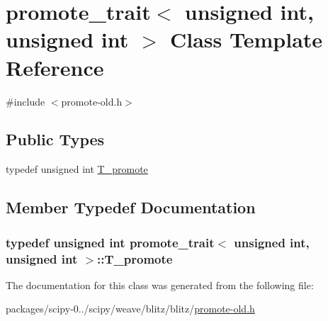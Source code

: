 \hypertarget{classpromote__trait_3_01unsigned_01int_00_01unsigned_01int_01_4}{}\section{promote\+\_\+trait$<$ unsigned int, unsigned int $>$ Class Template Reference}
\label{classpromote__trait_3_01unsigned_01int_00_01unsigned_01int_01_4}


{\ttfamily \#include $<$promote-\/old.\+h$>$}

\subsection*{Public Types}
\begin{DoxyCompactItemize}
\item 
typedef unsigned int \hyperlink{classpromote__trait_3_01unsigned_01int_00_01unsigned_01int_01_4_a8ac645c2963f59fdd0f97231034e2670}{T\+\_\+promote}
\end{DoxyCompactItemize}


\subsection{Member Typedef Documentation}
\hypertarget{classpromote__trait_3_01unsigned_01int_00_01unsigned_01int_01_4_a8ac645c2963f59fdd0f97231034e2670}{}
\subsubsection[{T\+\_\+promote}]{\setlength{\rightskip}{0pt plus 5cm}typedef unsigned int {\bf promote\+\_\+trait}$<$ unsigned int, unsigned int $>$\+::{\bf T\+\_\+promote}}\label{classpromote__trait_3_01unsigned_01int_00_01unsigned_01int_01_4_a8ac645c2963f59fdd0f97231034e2670}


The documentation for this class was generated from the following file\+:\begin{DoxyCompactItemize}
\item 
packages/scipy-\/0../scipy/weave/blitz/blitz/\hyperlink{promote-old_8h}{promote-\/old.\+h}\end{DoxyCompactItemize}
